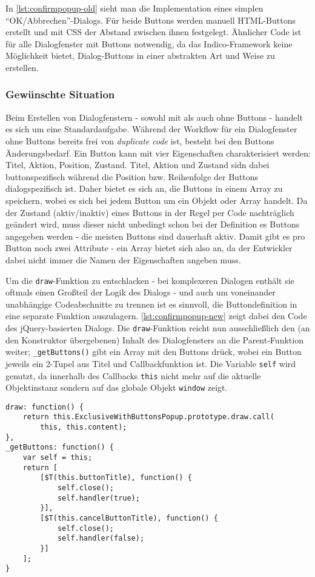 In \autoref{lst:confirmpopup-old} sieht man die Implementation eines simplen
\enquote{OK/Abbrechen}-Dialogs. Für beide Buttons werden manuell HTML-Buttons erstellt und mit CSS
der Abstand zwischen ihnen festgelegt. Ähnlicher Code ist für alle Dialogfenster mit Buttons
notwendig, da das Indico-Framework keine Möglichkeit bietet, Dialog-Buttons in einer abstrakten Art
und Weise zu erstellen.

\subsubsection{Gewünschte Situation}

Beim Erstellen von Dialogfenstern - sowohl mit als auch ohne Buttons - handelt es sich um eine
Standardaufgabe. Während der Workflow für ein Dialogfenster ohne Buttons bereits frei von
\emph{duplicate code} ist, besteht bei den Buttons Änderungsbedarf. Ein Button kann mit vier
Eigenschaften charakterisiert werden: Titel, Aktion, Position, Zustand. Titel, Aktion und Zustand
sidn dabei buttonspezifisch während die Position bzw. Reihenfolge der Buttons dialogspezifisch ist.
Daher bietet es sich an, die Buttons in einem Array zu speichern, wobei es sich bei jedem Button um
ein Objekt oder Array handelt. Da der Zustand (aktiv/inaktiv) eines Buttons in der Regel per Code
nachträglich geändert wird, muss dieser nicht unbedingt schon bei der Definition es Buttons
angegeben werden - die meisten Buttons sind dauerhaft aktiv. Damit gibt es pro Button noch zwei
Attribute - ein Array bietet sich also an, da der Entwickler dabei nicht immer die Namen der
Eigenschaften angeben muss.

Um die \lstinline{draw}-Funktion zu entschlacken - bei komplexeren Dialogen enthält sie oftmals
einen Großteil der Logik des Dialogs - und auch um voneinander unabhängige Codeabschnitte zu trennen
ist es sinnvoll, die Buttondefinition in eine separate Funktion auszulagern.
\autoref{lst:confirmpopup-new} zeigt dabei den Code des jQuery-basierten Dialogs. Die
\lstinline{draw}-Funktion reicht nun ausschließlich den (an den Konstruktor übergebenen) Inhalt des
Dialogfensters an die Parent-Funktion weiter; \lstinline{_getButtons()} gibt ein Array mit den
Buttons drück, wobei ein Button jeweils ein 2-Tupel aus Titel und Callbackfunktion ist. Die Variable
\lstinline{self} wird genutzt, da innerhalb des Callbacks \lstinline{this} nicht mehr auf die
aktuelle Objektinstanz sondern auf das globale Objekt \lstinline{window} zeigt.


\begin{lstlisting}[label=lst:confirmpopup-new,caption=jQuery-Code zum Erstellen eines simplen Dialogfensters]
draw: function() {
    return this.ExclusiveWithButtonsPopup.prototype.draw.call(
        this, this.content);
},
_getButtons: function() {
    var self = this;
    return [
        [$T(this.buttonTitle), function() {
            self.close();
            self.handler(true);
        }],
        [$T(this.cancelButtonTitle), function() {
            self.close();
            self.handler(false);
        }]
    ];
}
\end{lstlisting}

